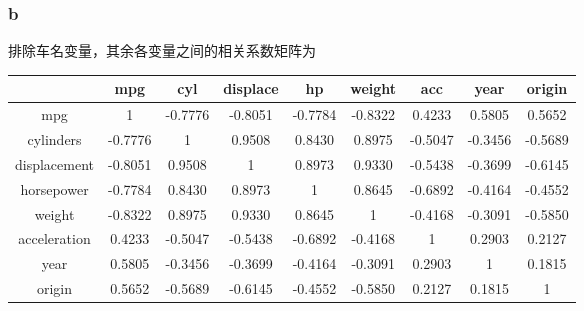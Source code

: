 \documentclass[12pt,a4paper]{article}
\begin{document}
    \subsubsection*{b}
    排除车名变量，其余各变量之间的相关系数矩阵为
    \begin{longtable}{c|cccccccc}
        \hline
         & mpg & cyl & displace & hp & weight & acc & year & origin\\
        \hline
        mpg & 1 & -0.7776 & -0.8051 & -0.7784 & -0.8322 & 0.4233 & 0.5805 & 0.5652\\
        cylinders & -0.7776 & 1 & 0.9508 & 0.8430 & 0.8975 & -0.5047 & -0.3456 & -0.5689\\
        displacement & -0.8051 & 0.9508 & 1 & 0.8973 & 0.9330 & -0.5438 & -0.3699 & -0.6145\\
        horsepower & -0.7784 & 0.8430 & 0.8973 & 1 & 0.8645 & -0.6892 & -0.4164 & -0.4552\\
        weight & -0.8322 & 0.8975 & 0.9330 & 0.8645 & 1 & -0.4168 & -0.3091 & -0.5850\\
        acceleration & 0.4233 & -0.5047 & -0.5438 & -0.6892 & -0.4168 & 1 & 0.2903 & 0.2127\\
        year & 0.5805 & -0.3456 & -0.3699 & -0.4164 & -0.3091 & 0.2903 & 1 & 0.1815\\
        origin & 0.5652 & -0.5689 & -0.6145 & -0.4552 & -0.5850 & 0.2127 & 0.1815 & 1\\
        \hline
    \end{longtable}
\end{document}
